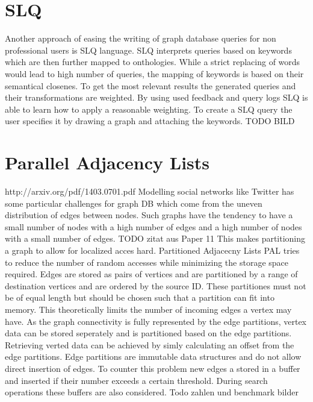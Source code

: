 \documentclass{sig-alternate}
\begin{document}
\section{SLQ}
Another approach of easing the writing of graph database queries for non
professional users is SLQ language. SLQ interprets queries based on 
keywords which are then further mapped to onthologies. 
While a strict replacing of words would lead to high number of queries,
the mapping of keywords is based on their semantical closenes.
To get the most relevant results the generated queries and their transformations
are weighted. By using used feedback and query logs SLQ is able to
learn how to apply a reasonable weighting.
To create a SLQ query the user specifies it by drawing a graph
and attaching the keywords.
TODO BILD

\section{Parallel Adjacency Lists}
http://arxiv.org/pdf/1403.0701.pdf
Modelling social networks like Twitter has some particular challenges
for graph DB which come from the uneven distribution of edges between nodes.
Such graphs have the tendency to have a small number of nodes with a high number of edges
and a high number of nodes with a small number of edges. TODO zitat aus Paper 11
This makes partitioning a graph to allow for localized acces hard.
Partitioned Adjacecny Lists PAL tries to reduce the number of random accesses while minimizing the storage
space required. Edges are stored as pairs of vertices and are partitioned by a range of destination
vertices and are ordered by the source ID. These partitiones must not be of equal length but should 
be chosen such that a partition can fit into memory. This theoretically limits the number of
incoming edges a vertex may have.
As the graph connectivity is fully represented 
by the edge partitions, vertex data can be stored seperately and is partitioned 
based on the edge partitions. Retrieving verted data can be achieved by simly calculating an offset from
the edge partitions.
Edge partitions are immutable data structures and do not allow direct insertion of edges. 
To counter this problem new edges a stored in a buffer and inserted if their number exceeds a certain threshold.
During search operations these buffers are also considered.
Todo zahlen und benchmark bilder
\end{document}
